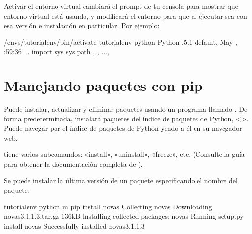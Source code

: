 \documentclass[a4,10pt,spanish]{sphinxmanual}
\begin{document}
\sphinxAtStartPar
Activar el entorno virtual cambiará el prompt de tu consola para mostrar que entorno virtual está usando, y modificará el entorno para que al ejecutar  sea con esa versión e instalación en particular.  Por ejemplo:

\begin{sphinxVerbatim}[commandchars=\\\{\}]
\PYGZdl{}  \PYGZti{}/envs/tutorial\PYGZhy{}env/bin/activate
tutorial\PYGZhy{}env \PYGZdl{} python
Python .5.1 default, May   , :59:36
  ...
\PYGZgt{}\PYGZgt{}\PYGZgt{} import sys
\PYGZgt{}\PYGZgt{}\PYGZgt{} sys.path
\PYG{o}{[}, , ...,
\PYG{o}{]}
\PYGZgt{}\PYGZgt{}\PYGZgt{}
\end{sphinxVerbatim}


\section{Manejando paquetes con pip}
\label{\detokenize{tutorial/venv:managing-packages-with-pip}}
\sphinxAtStartPar
Puede instalar, actualizar y eliminar paquetes usando un programa llamado . De forma predeterminada,  instalará paquetes del índice de paquetes de Python, <>. Puede navegar por el índice de paquetes de Python yendo a él en su navegador web.

\sphinxAtStartPar
{} tiene varios subcomandos: «install», «uninstall», «freeze», etc. (Consulte la guía  para obtener la documentación completa de ).

\sphinxAtStartPar
Se puede instalar la última versión de un paquete especificando el nombre del paquete:

\begin{sphinxVerbatim}[commandchars=\\\{\}]
tutorial\PYGZhy{}env \PYGZdl{} python \PYGZhy{}m pip install novas
Collecting novas
  Downloading novas\PYGZhy{}3.1.1.3.tar.gz 136kB
Installing collected packages: novas
  Running setup.py install  novas
Successfully installed novas\PYGZhy{}3.1.1.3
\end{sphinxVerbatim}
\end{document}
